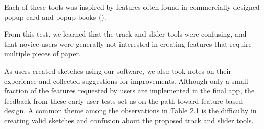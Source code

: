 Each of these tools was inspired by features often found in
commercially-designed popup card and popup books
(\citet{birmingham1997pop}).

From this test, we learned that the track and slider tools were
confusing, and that novice users were generally not interested in
creating features that require multiple pieces of paper.

As users created sketches using our software, we also took notes on
their experience and collected suggestions for improvements. Although
only a small fraction of the features requested by users are implemented
in the final app, the feedback from these early user tests set us on the
path toward feature-based design. A common theme among the observations
in Table 2.1 is the difficulty in creating valid sketches and confusion
about the proposed track and slider tools.

